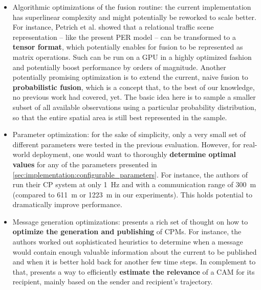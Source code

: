 \begin{itemize}
	\item Algorithmic optimizations of the fusion routine: the current implementation has superlinear complexity and might potentially be reworked to scale better. For instance, Petrich et al. \cite{Petrich2018} showed that a relational traffic scene representation – like the present PER model – can be transformed to a \textbf{tensor format}, which potentially enables for fusion to be represented as matrix operations. Such can be run on a GPU in a highly optimized fashion and potentially boost performance by orders of magnitude. Another potentially promising optimization is to extend the current, naive fusion to \textbf{probabilistic fusion}, which is a concept that, to the best of our knowledge, no previous work had covered, yet. The basic idea here is to sample a smaller subset of all available observations using a particular probability distribution, so that the entire spatial area is still best represented in the sample. 
	\item Parameter optimization: for the sake of simplicity, only a very small set of different parameters were tested in the previous evaluation. However, for real-world deployment, one would want to thoroughly \textbf{determine optimal values} for any of the parameters presented in \cref{sec:implementation:configurable_parameters}. For instance, the authors of \cite{Gunther2015} run their CP system at only \SI{1}{\hertz} and with a communication range of \SI{300}{\meter} (compared to \SI{611}{\meter} or \SI{1223}{\meter} in our experiments). This holds potential to dramatically improve performance.
	\item Message generation optimizations: \cite{Thandavarayan2019} presents a rich set of thought on how to \textbf{optimize the generation and publishing} of CPMs. For instance, the authors worked out sophisticated heuristics to determine when a message would contain enough valuable information about the current to be published and when it is better hold back for another few time steps. In complement to that, \cite{Breu2013} presents a way to efficiently \textbf{estimate the relevance} of a CAM for its recipient, mainly based on the sender and recipient's trajectory.
\end{itemize}
\par
\bigskip

